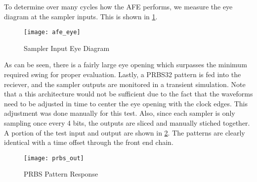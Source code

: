 To determine over many cycles how the AFE performs, we measure the eye diagram at the sampler inputs. This is shown in \ref{fig:eye}.
\begin{figure}[h]
\centering
\texttt{[image: afe\_eye]}
\caption{Sampler Input Eye Diagram}
\label{fig:eye}
\end{figure}
As can be seen, there is a fairly large eye opening which surpasses the minimum required swing for proper evaluation.
\clearpage
Lastly, a PRBS32 pattern is fed into the reciever, and the sampler outputs are monitored in a transient simulation. Note that a this architecture would not be sufficient due to the fact that the waveforms need to be adjusted in time to center the eye opening with the clock edges. This adjustment was done manually for this test. Also, since each sampler is only sampling once every 4 bits, the outputs are sliced and manually stiched together. A portion of the test input and output are shown in \ref{fig:prbs}. The patterns are clearly identical with a time offset through the front end chain.
\begin{figure}[h]
\centering
\texttt{[image: prbs\_out]}
\caption{PRBS Pattern Response}
\label{fig:prbs}
\end{figure}
\clearpage

